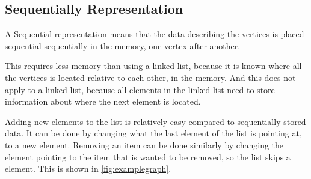\subsection{Sequentially Representation}
A Sequential representation means that the data describing the vertices is placed sequential sequentially in the memory, one vertex after another. 

This requires less memory than using a linked list, because it is known where all the vertices is located relative to each other, in the memory. And this does not apply to a linked list, because all elements in the linked list need to store information about where the next element is located.

Adding new elements to the list is relatively easy compared to sequentially stored data.
It can be done by changing what the last element of the list is pointing at, to a new element.
Removing an item can be done similarly by changing the element pointing to the item that is wanted to be removed, so the list skips a element. This is shown in \cref{fig:examplegraph}. %








